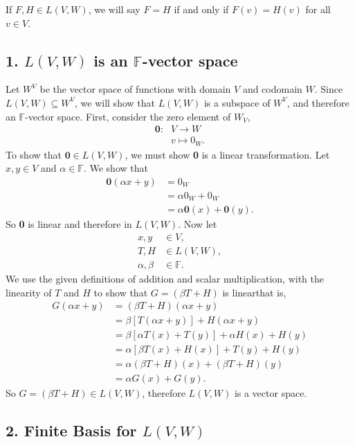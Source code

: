 \documentclass[12pt]{article}
\newcommand{\F}{\mathbb{F}}
\begin{document}
If $F, H \in L(V,W)$, we will say $F=H$ if and only if $F(v) = H(v)$ for all $v\in V$.

\subsection*{1. $L(V, W)$ is an $\F$-vector space}
Let $W^V$ be the vector space of functions with domain $V$ and codomain $W$. Since $L(V, W)\subseteq W^V$, we will show that $L(V,W)$ is a subspace of $W^V$, and therefore an $\F$-vector space. First, consider the zero element of $W_V$,
\begin{align*}
    \textbf{0}:    & V\rightarrow W \\
                & v \mapsto 0_W.
\end{align*}
To show that $\textbf{0}\in L(V,W)$, we must show \textbf{0} is a linear transformation. Let $x,y\in V$ and $\alpha\in\F$. We show that
\begin{align*}
    \textbf{0}(\alpha x+y)      &= 0_W \\
                                &= \alpha 0_W + 0_W \\
                                &= \alpha \textbf{0}(x) + \textbf{0}(y).
\end{align*}
So \textbf{0} is linear and therefore in $L(V,W)$. Now let
\begin{align*}
    x,y             &\in V, \\
    T,H             &\in L(V,W), \\
    \alpha, \beta   &\in\F.
\end{align*}
We use the given definitions of addition and scalar multiplication, with the linearity of $T$ and $H$ to show that $G=(\beta T + H)$ is linear\textemdash that is,
\begin{align*}
    G(\alpha x + y)     &= (\beta T + H)(\alpha x + y) \\
                        &= \beta [T(\alpha x + y)] + H(\alpha x + y) \\
                        &= \beta [\alpha T(x) + T(y)] + \alpha H(x) + H(y) \\
                        &= \alpha [\beta T(x) + H(x)] + T(y) + H(y) \\
                        &= \alpha (\beta T + H)(x) + (\beta T + H)(y) \\
                        &= \alpha G(x) + G(y).
\end{align*}
So $G=(\beta T + H)\in L(V,W)$, therefore $L(V,W)$ is a vector space.


\subsection*{2. Finite Basis for $L(V,W)$}
\end{document}
